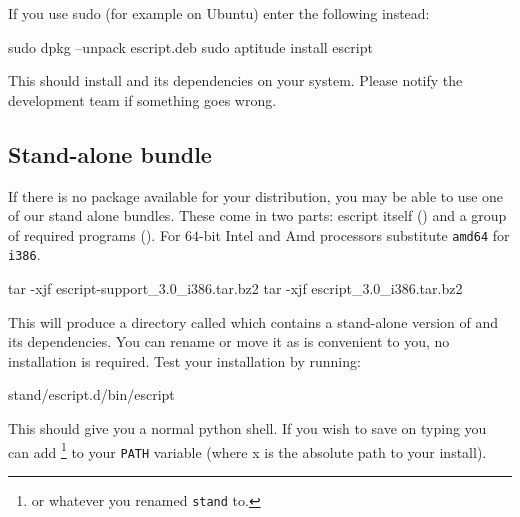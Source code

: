 If you use sudo (for example on Ubuntu) enter the following instead:
\begin{shellCode}
sudo dpkg --unpack escript.deb
sudo aptitude install escript
\end{shellCode}

This should install \esfinley and its dependencies on your system.
Please notify the development team if something goes wrong.


\subsection{Stand-alone bundle}\label{sec:standalonelinux}

If there is no package available for your distribution, you may be able to use one of our stand alone bundles.
These come in two parts: escript itself () and a group of required programs (). For $64$-bit Intel and Amd processors substitute \texttt{amd64} for \texttt{i386}.
\begin{shellCode}
tar -xjf escript-support_3.0_i386.tar.bz2
tar -xjf escript_3.0_i386.tar.bz2
\end{shellCode}
This will produce a directory called  which contains a stand-alone version of \esfinley and its dependencies.
You can rename or move it as is convenient to you, no installation is required.
Test your installation by running:
\begin{shellCode}
stand/escript.d/bin/escript
\end{shellCode}
This should give you a normal python shell.
If you wish to save on typing you can add \footnote{or whatever you renamed \texttt{stand} to.} to your \texttt{PATH} variable (where x is the absolute path to your install).

